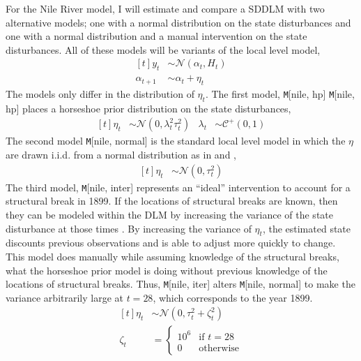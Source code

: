 \documentclass{article}
\newcommand{\dist}[1]{\mathcal{#1}}
\newcommand{\paren}[1]{\ensuremath{\left(#1\right)}}
\newcommand{\dnorm}[1]{\ensuremath{\dist{N}\paren{#1}}}
\newcommand{\dhalfcauchy}[1]{\ensuremath{\dist{C}^{+}\paren{#1}}}
\newcommand{\Model}[2]{\texttt{M}[#1, #2]}
\begin{document}
For the Nile River model, I will estimate and compare a SDDLM with two alternative models; one with a normal distribution on the state disturbances and one with a normal distribution and a manual intervention on the state disturbances.
All of these models will be variants of the local level model,
\begin{equation}
  \label{eq:21}
  \begin{aligned}[t]
    y_{t} &\sim \dnorm{\alpha_{t}, H_{t}} \\
    \alpha_{t + 1} &\sim \alpha_{t} + \eta_{t}
  \end{aligned}
\end{equation}
The models only differ in the distribution of $\eta_{t}$.
The first model, \Model{nile}{hp} \Model{nile}{hp} places a horseshoe prior distribution on the state disturbances,
\begin{equation}
  \label{eq:22}
  \begin{aligned}[t]
    \eta_{t} & \sim \dnorm{0, \lambda^{2}_{t} \tau_{t}^{2}} & \lambda_{t} & \sim \dhalfcauchy{0, 1}
  \end{aligned}
\end{equation}
The second model \Model{nile}{normal} is the standard local level model in which the $\eta$ are drawn i.i.d. from a normal distribution as in \textcite{DurbinKoopman2001} and \textcite{petris2011state},
\begin{equation}
  \label{eq:9}
  \begin{aligned}[t]
    \eta_{t} & \sim \dnorm{0, \tau_{t}^{2}}
  \end{aligned}
\end{equation}
The third model, \Model{nile}{inter} represents an ``ideal'' intervention to account for a structural break in 1899.
If the locations of structural breaks are known, then they can be modeled within the DLM by increasing the variance of the state disturbance at those times \textcite[Chapter 11][]{WestHarrison1997}.
By increasing the variance of $\eta_{t}$, the estimated state discounts previous observations and is able to adjust more quickly to change.
This model does manually while assuming knowledge of the structural breaks, what the horseshoe prior model is doing without previous knowledge of the locations of structural breaks.
Thus, \Model{nile}{iter} alters \Model{nile}{normal} to make the variance arbitrarily large at $t = 28$, which corresponds to the year 1899.
\begin{equation}
  \label{eq:12}
  \begin{aligned}[t]
    \eta_{t} & \sim \dnorm{0, \tau_{t}^{2} + \zeta_{t}^{2}} \\
    \zeta_{t} & = 
    \begin{cases}
      10^{6} & \text{if $t = 28$} \\
      0 & \text{otherwise}
    \end{cases}
  \end{aligned}
\end{equation}
\end{document}
